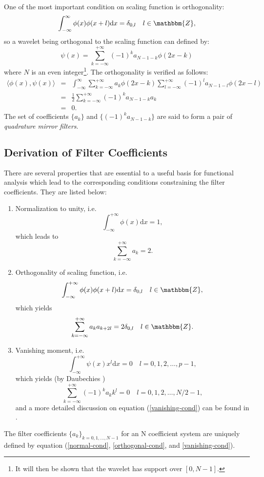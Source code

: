 \documentclass{book}
\newcommand{\mathd}{\mathrm{d}}
\newcommand{\tmtextit}[1]{{\itshape{#1}}}
\newenvironment{enumeratenumeric}{\begin{enumerate}[1.] }{\end{enumerate}}
\begin{document}
One of the most important condition on scaling function is orthogonality:
\[ \int_{- \infty}^{\infty} \phi (x) \phi (x + l) \mathd x = \delta_{0, l}
   \quad l \in \mathbbm{Z}, \]
so a wavelet being orthogonal to the scaling function can defined by:
\[ \psi (x) = \sum_{k = - \infty}^{+ \infty} (- 1)^k a_{N - 1 - k} \phi (2 x -
   k) \]
where $N$ is an even integer\footnote{It will then be shown that the wavelet
has support over $[0, N - 1]$.}. The orthogonality is verified as follows:
\begin{eqnarray*}
  \langle \phi (x), \psi (x) \rangle & = & \int_{- \infty}^{\infty} \sum_{k =
  - \infty}^{+ \infty} a_k \phi (2 x - k) \sum_{l = - \infty}^{+ \infty} (-
  1)^l a_{N - 1 - l} \phi (2 x - l)\\
  & = & \frac{1}{2} \sum_{k = - \infty}^{+ \infty} (- 1)^k a_{N - 1 - k}
  a_k\\
  & = & 0.
\end{eqnarray*}
The set of coefficients $\{ a_k \}$ and $\{ (- 1)^k a_{N - 1 - k} \}$ are said
to form a pair of \tmtextit{quadrature mirror filters}.

\subsection{Derivation of Filter Coefficients}

There are several properties that are essential to a useful basis for
functional analysis which lead to the corresponding conditions constraining
the filter coefficients. They are listed below:
\begin{enumeratenumeric}
  \item Normalization to unity, i.e.
  \[ \int_{- \infty}^{+ \infty} \phi (x) \mathd x = 1, \]
  which leads to
  \begin{equation}
    \sum_{k = - \infty}^{+ \infty} a_k = 2. \label{normal-cond}
  \end{equation}
  \item Orthogonality of scaling function, i.e.
  \[ \int_{- \infty}^{+ \infty} \phi (x) \phi (x + l) \mathd x = \delta_{0, l}
     \quad l \in \mathbbm{Z}, \]
  which yields
  \begin{equation}
    \sum_{k = - \infty}^{+ \infty} a_k a_{k + 2 l} = 2 \delta_{0, l} \quad l
    \in \mathbbm{Z}. \label{orthogonal-cond}
  \end{equation}
  \item Vanishing moment, i.e.
  \[ \int_{- \infty}^{+ \infty} \psi (x) x^l \mathd x = 0 \quad l = 0, 1, 2,
     \ldots, p - 1, \]
  which yields (by Daubechies {\cite{daubechies1992ten}})
  \begin{equation}
    \sum_{k = - \infty}^{+ \infty} (- 1)^k a_k k^l = 0 \quad l = 0, 1, 2,
    \ldots, N / 2 - 1 \label{vanishing-cond},
  \end{equation}
  and a more detailed discussion on equation (\ref{vanishing-cond}) can be
  found in {\cite{williams1994introduction}}.
\end{enumeratenumeric}
The filter coefficients $\{ a_k \}_{k = 0, 1, \ldots, N - 1}$ for an N
coefficient system are uniquely defined by equation (\ref{normal-cond},
\ref{orthogonal-cond}, and \ref{vanishing-cond}).
\end{document}
